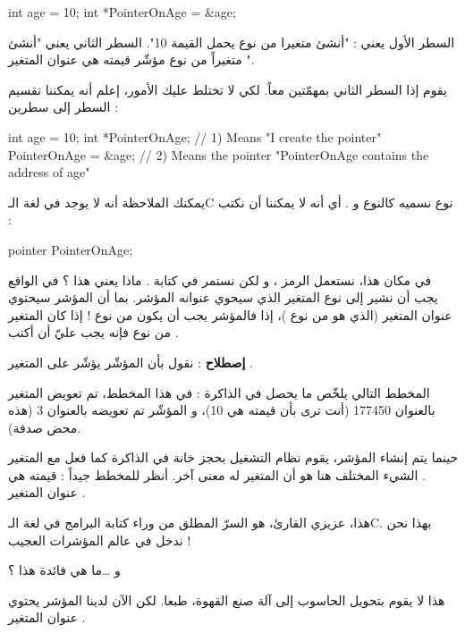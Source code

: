 \begin{Csource}
int age = 10;
int *PointerOnAge = &age;
\end{Csource}

السطر الأول يعني : "أنشئ متغيرا من نوع
يحمل القيمة 10". السطر الثاني يعني "أنشئ متغيراً من نوع مؤشّر قيمته هي عنوان المتغير
".

يقوم إذا السطر الثاني بمهمّتين معاً. لكي لا تختلط عليك الأمور، إعلم أنه يمكننا تقسيم السطر إلى سطرين :

\begin{Csource}
int age = 10;
int *PointerOnAge; // 1) Means "I create the pointer"
PointerOnAge = &age; // 2) Means the pointer "PointerOnAge contains the address of age"
\end{Csource}

يمكنك الملاحظة أنه لا يوجد في لغة الـ\textenglish{C}
نوع نسميه
كالنوع
و
.
أي أنه لا يمكننا أن نكتب :
\begin{Csource}
pointer PointerOnAge;
\end{Csource}
في مكان هذا، نستعمل الرمز
\InlineCode{*}
، و لكن نستمر في كتابة
.
ماذا يعني هذا ؟ في الواقع يجب أن نشير إلى نوع المتغير الذي سيحوي عنوانه المؤشر. بما أن المؤشر
سيحتوي عنوان المتغير
(الذي هو من نوع
)،
إذا فالمؤشر يجب أن يكون من نوع
! إذا كان المتغير من نوع
فإنه يجب عليّ أن أكتب
.

\textbf{إصطلاح}
: نقول بأن المؤشّر
يؤشّر على المتغير
.

المخطط التالي يلخّص ما يحصل في الذاكرة :
في هذا المخطط، تم تعويض المتغير
بالعنوان 177450 (أنت ترى بأن قيمته هي 10)، و المؤشّر
تم تعويضه بالعنوان 3 (هذه محض صدفة).

حينما يتم إنشاء المؤشر، يقوم نظام التشغيل بحجز خانة في الذاكرة كما فعل مع المتغير
.
الشيء المختلف هنا هو أن المتغير
له معنى آخر. أنظر للمخطط جيداً : قيمته هي عنوان المتغير
.

هذا، عزيزي القارئ، هو السرّ المطلق من وراء كتابة البرامج في لغة الـ\textenglish{C}.
بهذا نحن ندخل في عالم المؤشرات العجيب !
\begin{question}
	و \dots ما هي فائدة هذا ؟
\end{question}
هذا لا يقوم بتحويل الحاسوب إلى آلة صنع القهوة، طبعا. لكن الآن لدينا المؤشر
يحتوي عنوان المتغير
.

